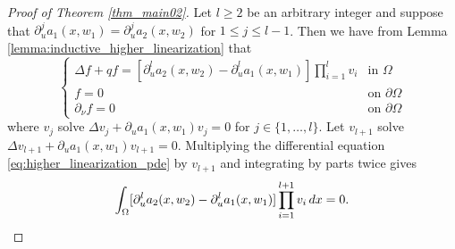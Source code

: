 \documentclass[11pt,a4paper]{amsart}
\theoremstyle{definition}
\numberwithin{equation}{section}
\newcommand{\p}{\partial}
\begin{document}


\begin{proof}[Proof of Theorem \ref{thm_main02}]
Let \( l\geq 2 \) be an arbitrary integer and suppose that \( \partial^{j}_{u}a_{1}(x,w_{1}) = \partial^{j}_{u}a_{2}(x,w_{2}) \) for \( 1\leq j \leq l-1 \).
Then we have from Lemma \ref{lemma:inductive_higher_linearization} that
\begin{equation}\label{eq:higher_linearization_pde}
	\begin{cases}
		\Delta f + qf = [\partial_{u}^{l}a_{2}(x,w_{2})-\partial_{u}^{l}a_{1}(x,w_{1})] \prod_{i=1}^{l}v_{i} &\text{in }\Omega \\
	f = 0 &\text{on }\partial\Omega \\
	\partial_{\nu}f = 0 &\text{on }\partial\Omega
\end{cases}
\end{equation}
where \( v_{j} \) solve \( \Delta v_{j} + \partial_{u}a_{1}(x,w_{1})v_{j} = 0 \) for \( j\in\{1,\ldots,l\} \).
Let \( v_{l+1} \) solve \( \Delta v_{l+1} + \partial_{u}a_{1}(x,w_{1})v_{l+1} = 0 \).
Multiplying the differential equation \eqref{eq:higher_linearization_pde} by \( v_{l+1} \) and integrating by parts twice gives
\begin{equation*}
	\int_{\Omega}[\partial_{u}^{l}a_{2}(x,w_{2})-\partial_{u}^{l}a_{1}(x,w_{1})] \prod_{i=1}^{l+1}v_{i} \,dx = 0. \qedhere
\end{equation*}    
\end{proof}
\end{document}
